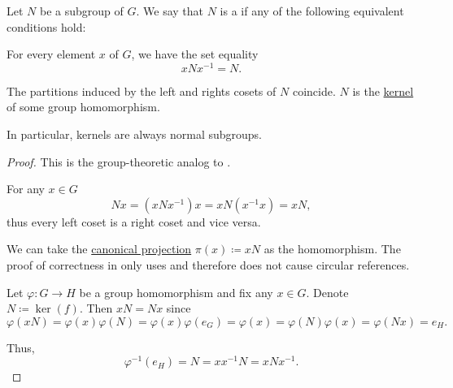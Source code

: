 \begin{definition}\label{def:normal_subgroup}
  Let \( N \) be a subgroup of \( G \). We say that \( N \) is a  if any of the following equivalent conditions hold:
  \begin{thmenum}
     For every element \( x \) of \( G \), we have the set equality
    \begin{equation}\label{eq:def:normal_subgroup/direct}
      x N x^{-1} = N.
    \end{equation}

     The partitions induced by the left and rights cosets of \( N \) coincide.
     \( N \) is the \hyperref[def:pointed_set_kernel]{kernel} of some group homomorphism.
  \end{thmenum}

  In particular, kernels are always normal subgroups.
\end{definition}
\begin{proof}
  This is the group-theoretic analog to .

   For any \( x \in G \)
  \begin{equation*}
    N x = (x N x^{-1})x = x N(x^{-1}x) = x N,
  \end{equation*}
  thus every left coset is a right coset and vice versa.

   We can take the \hyperref[def:quotient_group]{canonical projection} \( \pi(x) \coloneqq x N \) as the homomorphism. The proof of correctness in  only uses  and therefore does not cause circular references.

   Let \( \varphi: G \to H \) be a group homomorphism and fix any \( x \in G \). Denote \( N \coloneqq \ker(f) \). Then \( x N = N x \) since
  \begin{equation*}
    \varphi(x N)
    =
    \varphi(x) \varphi(N)
    =
    \varphi(x) \varphi(e_G)
    =
    \varphi(x)
    =
    \varphi(N) \varphi(x)
    =
    \varphi(N x)
    =
    e_H.
  \end{equation*}

  Thus,
  \begin{equation*}
    \varphi^{-1}(e_H) = N = xx^{-1}N = x N x^{-1}.
  \end{equation*}
\end{proof}

